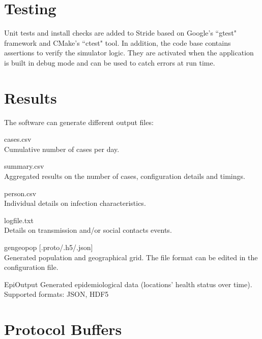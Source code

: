 %
\section{Testing}
Unit tests and install checks are added to Stride based on Google's ``gtest" framework and CMake's ``ctest" tool.
In addition, the code base contains assertions to verify the simulator logic.
They are activated when the application is built in debug mode and can be used to catch errors at run time.


\section{Results}
\label{section:Results}

The software can generate different output files:
\begin{compactdesc}
	\item [cases.csv] \ \\
	Cumulative number of cases per day.
	\item [summary.csv] \ \\
	Aggregated results on the number of cases, configuration details and timings.
	\item [person.csv] \ \\
	Individual details on infection characteristics.
	\item [logfile.txt] \ \\
	Details on transmission and/or social contacts events.
    \item [gengeopop {[.proto/.h5/.json]}] \ \\
    Generated population and geographical grid. The file format can be edited in the configuration file.
    \item [EpiOutput]
    Generated epidemiological data (locations' health status over time). Supported formats: JSON, HDF5
\end{compactdesc}


\section{Protocol Buffers}
\label{section:protobuf}

